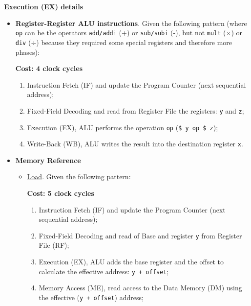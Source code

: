 \begin{flushleft}
    \textcolor{Red3}{\textbf{Execution (EX) details}}\label{Execution (EX) details}
\end{flushleft}
\begin{itemize}
    \item \textbf{Register-Register ALU instructions}. Given the following pattern (where \texttt{op} can be the operators \texttt{add/addi} (+) or \texttt{sub/subi} (-), but not \texttt{mult} ($\times$) or \texttt{div} ($\div$) because they required some special registers and therefore more phases):
    
    \textbf{Cost: 4 clock cycles}
    \begin{enumerate}
        \item Instruction Fetch (IF) and update the Program Counter (next sequential address);

        \item Fixed-Field Decoding and read from Register File the registers: \texttt{y} and \texttt{z};
        
        \item Execution (EX), ALU performs the operation \texttt{op} (\texttt{\$ y op \$ z});

        \item Write-Back (WB), ALU writes the result into the destination register \texttt{x}.
    \end{enumerate}

    \item \textbf{Memory Reference}
    \begin{itemize}
        \item \underline{Load}. Given the following pattern:
        
        \textbf{Cost: 5 clock cycles}
        \begin{enumerate}
            \item Instruction Fetch (IF) and update the Program Counter (next sequential address);

            \item Fixed-Field Decoding and read of Base and register \texttt{y} from Register File (RF);

            \item Execution (EX), ALU adds the base register and the offset to calculate the effective address: \texttt{y + offset};

            \item Memory Access (ME), read access to the Data Memory (DM) using the effective (\texttt{y + offset}) address;


\end{enumerate}
\end{itemize}
\end{itemize}
